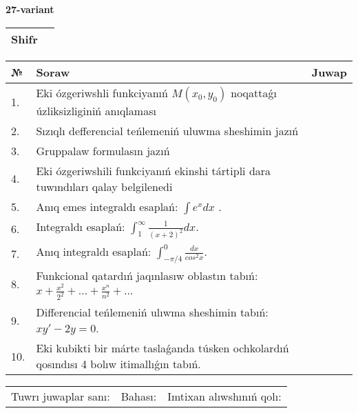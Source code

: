 \documentclass{article}
\begin{document}
  \egroup
  
  \newpage
  
  
  \textbf{27-variant}\\
  
  \bgroup
  \def\arraystretch{1.6} %
  
  \begin{tabular}{|m{5.7cm}|m{9.5cm}|}
  \hline
  Shifr & \\
  \hline
  \end{tabular}
  
  \vspace{1cm}
  
  \begin{tabular}{|m{0.7cm}|m{10cm}|m{4cm}|}
  \hline
  № & Soraw & Juwap \\
  \hline
  1. & Eki ózgeriwshli funkciyanıń \(M(x_{0}, y_{0})\) noqattaǵı úzliksizliginiń anıqlaması &  \\
  \hline
  2. & Sızıqlı defferencial teńlemeniń uluwma sheshimin jazıń &  \\
  \hline
  3. & Gruppalaw formulasın jazıń &  \\
  \hline
  4. & Eki ózgeriwshili funkciyanıń ekinshi tártipli dara tuwındıları qalay belgilenedi &  \\
  \hline
  5. & Anıq emes integraldı esaplań: \(\int{e^{x}dx}\) . &  \\
  \hline
  6. & Integraldı esaplań: \(\int_{1}^{\infty}{\frac{1}{(x + 2)^2 }dx}\). &  \\
  \hline
  7. & Anıq integraldı esaplań: \(\int_{- \pi/4}^{0}\frac{dx}{cos^2 x}\). &  \\
  \hline
  8. & Funkcional qatardıń jaqınlasıw oblastın tabıń: \(x + \frac{x^2 }{2^2 } + ... + \frac{x^{n}}{n^2 } + ...\) &  \\
  \hline
  9. & Differencial teńlemeniń ulıwma sheshimin tabıń: \(xy' - 2y = 0\). &  \\
  \hline
  10. & Eki kubikti bir márte taslaǵanda túsken ochkolardıń qosındısı 4 bolıw itimallıǵın tabıń. &  \\
  \hline
  \end{tabular}
  
  \vspace{1cm}
  
  \begin{tabular}{lll}
  Tuwrı juwaplar sanı: \underline{\hspace{1.5cm}} & 
  Bahası: \underline{\hspace{1.5cm}} & 
  Imtixan alıwshınıń qolı: \underline{\hspace{2cm}} \\
  \end{tabular}
  
\end{document}

